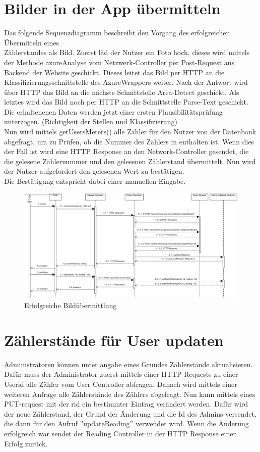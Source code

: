 \section{Bilder in der App übermitteln}
Das folgende Sequenzdiagramm beschreibt den Vorgang des erfolgreichen Übermitteln eines \\Zählerstandes als Bild.
Zuerst läd der Nutzer ein Foto hoch, dieses wird mittels der Methode azureAnalyse vom Netzwerk-Controller per Post-Request ans Backend der Website geschickt. Dieses leitet das Bild per HTTP an die Klassifizierungsschnittstelle des AzureWrappers weiter. Nach der Antwort wird über HTTP das Bild an die nächste Schnittstelle Area-Detect geschickt. Als letztes wird das Bild noch per HTTP an die Schnittstelle Parse-Text geschickt. Die erhaltenenen Daten werden jetzt einer ersten Plausibilitätsprüfung unterzogen. (Richtigkeit der Stellen und Klassifizierung) \\
Nun wird mittels getUsersMeters() alle Zähler für den Nutzer von der Datenbank abgefragt, um zu Prüfen, ob die Nummer des Zählers in enthalten ist.
Wenn dies der Fall ist wird eine HTTP Response an den Network-Controller gesendet, die die gelesene Zählernummer und den gelesenen Zählerstand übermittelt. Nun wird der Nutzer aufgefordert den gelesenen Wert zu bestätigen. \\
Die Bestätigung entspricht dabei einer manuellen Eingabe.
\begin{figure}[H]
	\centering
	\caption{Erfolgreiche Bildübermittlung}
	\includegraphics[width=16cm]{img/diagrams/SubmitFotoSequence}
\end{figure}


\section{Zählerstände für User updaten}
Administratoren können unter angabe eines Grundes Zählerstände aktualisieren.
Dafür muss der Administrator zuerst mittels einer HTTP-Requests zu einer Userid alle Zähler vom User Controller abfragen. Danach wird mittels einer weiteren Anfrage alle Zählerstände des Zählers abgefragt. Nun kann mittels eines PUT-request mit der rid ein bestimmter Eintrag verändert werden. Dafür wird der neue Zählerstand, der Grund der Änderung und die Id des Admins versendet, die dann für den Aufruf ''updateReading'' verwendet wird. Wenn die Änderung erfolgreich war sendet der Reading Controller in der HTTP Response einen Erfolg zurück.

